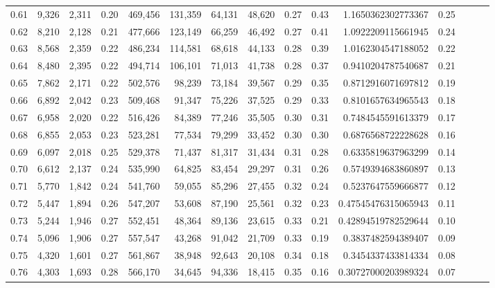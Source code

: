 \begin{tabular}{rrrrrrrrrrrrrrr}
0.61 &   9,326 &  2,311 &  0.20 &  469,456 &  131,359 &   64,131 &   48,620 &  0.27 &  0.43 &    1.1650362302773367 &      0.25 \\
0.62 &   8,210 &  2,128 &  0.21 &  477,666 &  123,149 &   66,259 &   46,492 &  0.27 &  0.41 &    1.0922209115661945 &      0.24 \\
0.63 &   8,568 &  2,359 &  0.22 &  486,234 &  114,581 &   68,618 &   44,133 &  0.28 &  0.39 &    1.0162304547188052 &      0.22 \\
0.64 &   8,480 &  2,395 &  0.22 &  494,714 &  106,101 &   71,013 &   41,738 &  0.28 &  0.37 &    0.9410204787540687 &      0.21 \\
0.65 &   7,862 &  2,171 &  0.22 &  502,576 &   98,239 &   73,184 &   39,567 &  0.29 &  0.35 &    0.8712916071697812 &      0.19 \\
0.66 &   6,892 &  2,042 &  0.23 &  509,468 &   91,347 &   75,226 &   37,525 &  0.29 &  0.33 &    0.8101657634965543 &      0.18 \\
0.67 &   6,958 &  2,020 &  0.22 &  516,426 &   84,389 &   77,246 &   35,505 &  0.30 &  0.31 &    0.7484545591613379 &      0.17 \\
0.68 &   6,855 &  2,053 &  0.23 &  523,281 &   77,534 &   79,299 &   33,452 &  0.30 &  0.30 &    0.6876568722228628 &      0.16 \\
0.69 &   6,097 &  2,018 &  0.25 &  529,378 &   71,437 &   81,317 &   31,434 &  0.31 &  0.28 &    0.6335819637963299 &      0.14 \\
0.70 &   6,612 &  2,137 &  0.24 &  535,990 &   64,825 &   83,454 &   29,297 &  0.31 &  0.26 &    0.5749394683860897 &      0.13 \\
0.71 &   5,770 &  1,842 &  0.24 &  541,760 &   59,055 &   85,296 &   27,455 &  0.32 &  0.24 &    0.5237647559666877 &      0.12 \\
0.72 &   5,447 &  1,894 &  0.26 &  547,207 &   53,608 &   87,190 &   25,561 &  0.32 &  0.23 &   0.47545476315065943 &      0.11 \\
0.73 &   5,244 &  1,946 &  0.27 &  552,451 &   48,364 &   89,136 &   23,615 &  0.33 &  0.21 &   0.42894519782529644 &      0.10 \\
0.74 &   5,096 &  1,906 &  0.27 &  557,547 &   43,268 &   91,042 &   21,709 &  0.33 &  0.19 &    0.3837482594389407 &      0.09 \\
0.75 &   4,320 &  1,601 &  0.27 &  561,867 &   38,948 &   92,643 &   20,108 &  0.34 &  0.18 &    0.3454337433814334 &      0.08 \\
0.76 &   4,303 &  1,693 &  0.28 &  566,170 &   34,645 &   94,336 &   18,415 &  0.35 &  0.16 &   0.30727000203989324 &      0.07 \\

\end{tabular}
